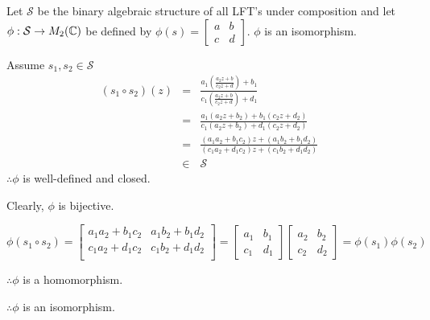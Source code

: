 \documentclass[letterpaper,12pt,fleqn]{article}
\renewcommand{\S}{\mathcal{S}}
\newcommand{\p}{\phi}
\begin{document}
\begin{theorem}
  Let $\S$ be the binary algebraic structure of all LFT's under composition
  and let $\p:\S\to M_2(\C)$ be defined by
  $\p(s)=\begin{bmatrix} a & b \\ c & d \end{bmatrix}$. $\p$ is an
  isomorphism.
\end{theorem}
\newpage
\begin{theproof}
  Assume $s_1,s_2\in\S$
  \begin{eqnarray*}
    (s_1\circ s_2)(z) &=& \frac{a_1\left(\frac{a_2z+b}{c_2z+d}\right)+b_1}
    {c_1\left(\frac{a_2z+b}{c_2z+d}\right)+d_1} \\
    &=& \frac{a_1(a_2z+b_2)+b_1(c_2z+d_2)}{c_1(a_2z+b_2)+d_1(c_2z+d_2)} \\
    &=& \frac{(a_1a_2+b_1c_2)z+(a_1b_2+b_1d_2)}
    {(c_1a_2+d_1c_2)z+(c_1b_2+d_1d_2)} \\
    &\in& \S
  \end{eqnarray*}
  $\therefore\p$ is well-defined and closed.

  Clearly, $\p$ is bijective.

  $\p(s_1\circ s_2)=\begin{bmatrix}
  a_1a_2+b_1c_2 & a_1b_2+b_1d_2 \\
  c_1a_2+d_1c_2 & c_1b_2+d_1d_2 \\
  \end{bmatrix}=
  \begin{bmatrix}
    a_1 & b_1 \\ c_1 & d_1
  \end{bmatrix}
  \begin{bmatrix}
    a_2 & b_2 \\ c_2 & d_2
  \end{bmatrix}=\p(s_1)\p(s_2)$
  
  $\therefore\p$ is a homomorphism.

  $\therefore\p$ is an isomorphism.
\end{theproof}
\end{document}
